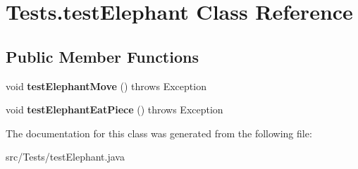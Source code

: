 \hypertarget{class_tests_1_1test_elephant}{}\section{Tests.\+test\+Elephant Class Reference}
\label{class_tests_1_1test_elephant}
\subsection*{Public Member Functions}
\begin{DoxyCompactItemize}
\item 
\mbox{\label{class_tests_1_1test_elephant_a7f479921fb60b6cce8a6f710f9543999}} 
void {\bfseries test\+Elephant\+Move} ()  throws Exception
\item 
\mbox{\label{class_tests_1_1test_elephant_a812f0993b146a922964214b7c2792cce}} 
void {\bfseries test\+Elephant\+Eat\+Piece} ()  throws Exception
\end{DoxyCompactItemize}


The documentation for this class was generated from the following file\+:\begin{DoxyCompactItemize}
\item 
src/\+Tests/test\+Elephant.\+java\end{DoxyCompactItemize}
